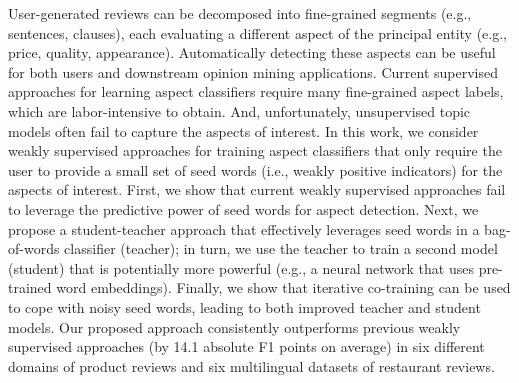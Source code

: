 User-generated reviews can be decomposed into fine-grained segments (e.g., sentences, clauses), each evaluating a different aspect of the principal entity (e.g., price, quality, appearance). Automatically detecting these aspects can be useful for both users and downstream opinion mining applications. Current supervised approaches for learning aspect classifiers require many fine-grained aspect labels, which are labor-intensive to obtain. And, unfortunately, unsupervised topic models often fail to capture the aspects of interest. In this work, we consider weakly supervised approaches for training aspect classifiers that only require the user to provide a small set of seed words (i.e., weakly positive indicators) for the aspects of interest. First, we show that current weakly supervised approaches fail to leverage the predictive power of seed words for aspect detection. Next, we propose a student-teacher approach that effectively leverages seed words in a bag-of-words classifier (teacher); in turn, we use the teacher to train a second model (student) that is potentially more powerful (e.g., a neural network that uses pre-trained word embeddings). Finally, we show that iterative co-training can be used to cope with noisy seed words, leading
to both improved teacher and student models. Our proposed approach consistently outperforms previous weakly supervised approaches (by 14.1 absolute F1 points on average) in six different domains of product reviews and six multilingual datasets of restaurant reviews.
